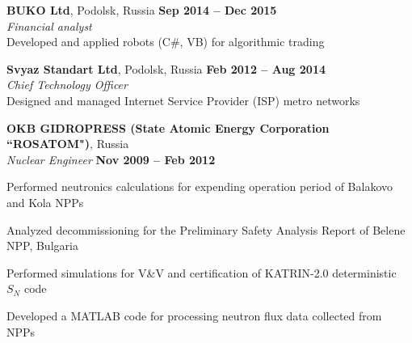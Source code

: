 \documentclass[margin,line]{resume}
\begin{document}
\begin{resume}
    \textbf{BUKO Ltd}, Podolsk, Russia \hfill \textbf{Sep 2014 -- Dec 2015}\\
		\textsl{Financial analyst}\\
		Developed and applied robots (C\#, VB) for algorithmic trading

    \textbf{Svyaz Standart Ltd}, Podolsk, Russia \hfill \textbf{Feb 2012 -- Aug 2014}\\
		\textsl{Chief Technology Officer}\\
		Designed and managed Internet Service Provider (ISP) metro networks

    \textbf{OKB GIDROPRESS (State Atomic Energy Corporation ``ROSATOM")}, 
    Russia \\
		\textsl{Nuclear Engineer} \hfill \textbf{Nov 2009 -- Feb 2012}\\
                \vspace{-4mm}\begin{list2}
				\item Performed neutronics calculations for expending 
				operation period of Balakovo and Kola NPPs
				\item Analyzed decommissioning for the Preliminary Safety 
				Analysis Report of Belene NPP, Bulgaria
				\item Performed simulations for V\&V and certification of  
				KATRIN-2.0 deterministic $S_N$ code
				\item Developed a MATLAB code for processing neutron flux data 
				collected from NPPs
                \end{list2}
 

\end{resume}
\end{document}
